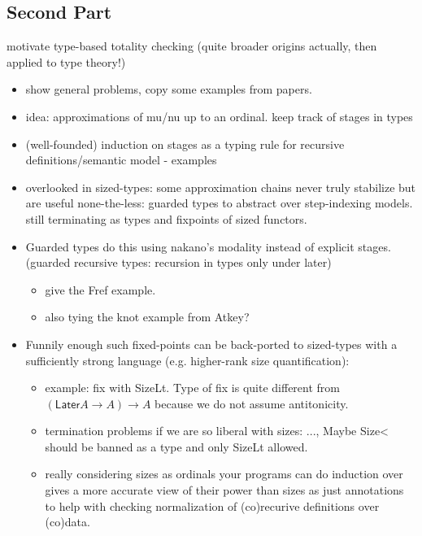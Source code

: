 \documentclass{book}
\begin{document}
\subsection{Second Part}

motivate type-based totality checking (quite broader origins actually, then applied to type theory!)

  \begin{itemize}
  \item show general problems, copy some examples from papers.
  \item idea: approximations of mu/nu up to an ordinal. keep track of stages in types
  \item (well-founded) induction on stages as a typing rule for recursive definitions/semantic model
    - examples 
  \item overlooked in sized-types: some approximation chains never truly
  stabilize but are useful none-the-less: guarded types to abstract
  over step-indexing models. still terminating as types and fixpoints of sized functors.
  \item Guarded types do this using nakano's modality instead of explicit stages. (guarded recursive types: recursion in types only under later)
    \begin{itemize}
    \item give the Fref example.
    \item also tying the knot example from Atkey?
    \end{itemize}
    
  \item Funnily enough such fixed-points can be back-ported to
    sized-types with a sufficiently strong language (e.g. higher-rank
    size quantification):
    \begin{itemize}
    \item example: fix with SizeLt. Type of fix is quite different from
    $(\mathsf{Later} A \to  A) \to A$ because we do not assume antitonicity.

    \item termination problems if we are so liberal with sizes: ..., Maybe Size< should be banned as a type and only SizeLt allowed.
    \item really considering sizes as ordinals your programs can do
         induction over gives a more accurate view of their power than sizes as just
         annotations to help with checking normalization of (co)recurive definitions over (co)data.
    \end{itemize}
    \end{itemize}
\end{document}
